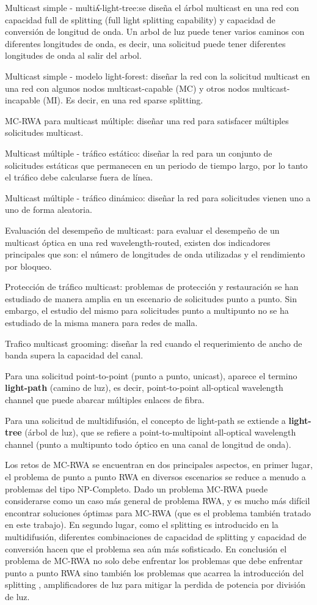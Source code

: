 Multicast simple - multiʎ-light-tree:se diseña el árbol multicast
en una red con capacidad full de splitting (full light splitting capability)
y capacidad de conversión de longitud de onda. Un arbol de luz puede
tener varios caminos con diferentes longitudes de onda, es decir,
una solicitud puede tener diferentes longitudes de onda al salir del
arbol.

Multicast simple - modelo light-forest: diseñar la red con la solicitud
multicast en una red con algunos nodos multicast-capable (MC) y otros
nodos multicast-incapable (MI). Es decir, en una red sparse splitting.

MC-RWA para multicast múltiple: diseñar una red para satisfacer múltiples
solicitudes multicast.

Multicast múltiple - tráfico estático: diseñar la red para un conjunto
de solicitudes estáticas que permanecen en un periodo de tiempo largo,
por lo tanto el tráfico debe calcularse fuera de línea.

Multicast múltiple - tráfico dinámico: diseñar la red para solicitudes
vienen uno a uno de forma aleatoria.

Evaluación del desempeño de multicast: para evaluar el desempeño de
un multicast óptica en una red wavelength-routed, existen dos indicadores
principales que son: el número de longitudes de onda utilizadas y
el rendimiento por bloqueo.

Protección de tráfico multicast: problemas de protección y restauración
se han estudiado de manera amplia en un escenario de solicitudes punto
a punto. Sin embargo, el estudio del mismo para solicitudes punto
a multipunto no se ha estudiado de la misma manera para redes de malla.

Trafico multicast grooming: diseñar la red cuando el requerimiento
de ancho de banda supera la capacidad del canal.

Para una solicitud point-to-point (punto a punto, unicast), aparece
el termino \textbf{light-path} (camino de luz), es decir, point-to-point
all-optical wavelength channel que puede abarcar múltiples enlaces
de fibra.

Para una solicitud de multidifusión, el concepto de light-path se
extiende a\textbf{ light-tree} (árbol de luz), que se refiere a point-to-multipoint
all-optical wavelength channel (punto a multipunto todo óptico en
una canal de longitud de onda).

Los retos de MC-RWA se encuentran en dos principales aspectos, en
primer lugar, el problema de punto a punto RWA \cite{zang2000review}en
diversos escenarios se reduce a menudo a problemas del tipo NP-Completo.
Dado un problema MC-RWA puede considerarse como un caso más general
de problema RWA, y es mucho más difícil encontrar soluciones óptimas
para MC-RWA (que es el problema también tratado en este trabajo).
En segundo lugar, como el splitting es introducido en la multidifusión,
diferentes combinaciones de capacidad de splitting y capacidad de
conversión hacen que el problema sea aún más sofisticado. En conclusión
el problema de MC-RWA no solo debe enfrentar los problemas que debe
enfrentar punto a punto RWA sino también los problemas que acarrea
la introducción del splitting , amplificadores de luz para mitigar
la perdida de potencia por división de luz.
